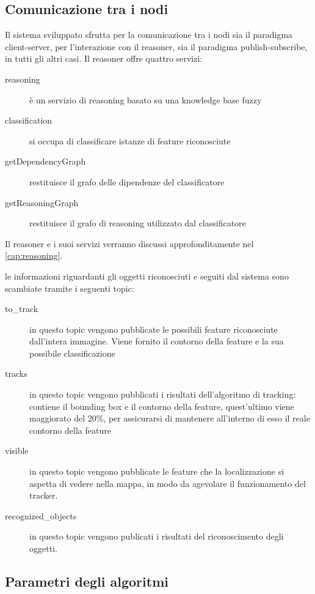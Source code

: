 \clearpage


\subsection{Comunicazione tra i nodi}

Il sistema sviluppato sfrutta per la comunicazione tra i nodi sia il paradigma client-server, per l'interazione con il reasoner, sia il paradigma publish-subscribe, in tutti gli altri casi.
Il reasoner offre quattro servizi:

\begin{description}
 \item [\/reasoning] è un  servizio di reasoning basato su una knowledge base fuzzy
 \item [\/classification] si occupa di classificare istanze di feature riconosciute
 \item [\/getDependencyGraph] restituisce il grafo delle dipendenze del classificatore
 \item [\/getReasoningGraph] restituisce il grafo di reasoning utilizzato dal classificatore
\end{description}

Il reasoner e i suoi servizi verranno discussi approfonditamente  nel \autoref{cap:reasoning}.

le informazioni riguardanti gli oggetti riconosciuti e seguiti dal sistema sono scambiate tramite i seguenti topic:

\begin{description}
 \item [\/to\_track] in questo topic vengono pubblicate le possibili feature riconosciute dall'intera immagine. Viene fornito il contorno della feature e la sua possibile classificazione
 \item [\/tracks] in questo topic vengono pubblicati i risultati dell'algoritmo di tracking: contiene il bounding box e il contorno della feature, quest'ultimo viene maggiorato del 20\%, per assicurarsi di mantenere all'interno di esso il reale contorno della feature
 \item [\/visible] in questo topic vengono pubblicate le feature che la localizzazione si aspetta di vedere nella mappa, in modo da agevolare il funzionamento del tracker.
 \item [\/recognized\_objects] in questo topic vengono publicati i risultati del riconoscimento degli oggetti.
\end{description}


\subsection{Parametri degli algoritmi}

